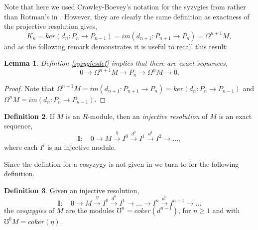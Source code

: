 \documentclass[11.5pt, twoside, a4paper, titlepage]{report}
\theoremstyle{definition}
\newtheorem{mydef}{Definition}[section]
\theoremstyle{plain}
\newtheorem{lem}[mydef]{Lemma}
\begin{document}
Note that here we used Crawley-Boevey's notation for the syzygies from \cite{CB1} rather than Rotman's in \cite{Rotman}. However, they are clearly the same definition as exactness of the projective resolution gives,
\begin{equation*}
K_n=ker(d_n:P_n \to P_{n-1}) = im(d_{n+1}:P_{n+1} \to P_n)=\Omega^{n+1}M,
\end{equation*}
and as the following remark demonstrates it is useful to recall this result:

\begin{lem} \label{syzygylem}
Defintion \ref{syzygiesdef} implies that there are exact sequences,
\begin{equation*}
0 \xrightarrow{} \Omega^{n+1}M \xrightarrow{} P_n \xrightarrow{} \Omega^nM \xrightarrow{} 0.
\end{equation*}
\end{lem}
\begin{proof}
Note that $\Omega^{n+1}M=im(d_{n+1}:P_{n+1} \to P_n)=ker(d_n:P_n \to P_{n-1})$ and $\Omega^nM=im(d_n:P_n \to P_{n-1})$.
\end{proof}

\begin{mydef}
If $M$ is an $R$-module, then an \emph{injective resolution} of $M$ is an exact sequence, 
\begin{equation*}
\mathbf{I}: \quad 0 \xrightarrow{}M \xrightarrow{\eta}I^0 \xrightarrow{d^0} I^1 \xrightarrow{d^1} I^2 \xrightarrow{} \dots,
\end{equation*}
where each $I^i$ is an injective module.
\end{mydef}

Since the defintion for a cosyzygy is not given in \cite{CB1} we turn to \cite{Rotman} for the following definition.

\begin{mydef}
Given an injective resolution,
\begin{equation*}
\mathbf{I}: \quad  0 \xrightarrow{} M \xrightarrow{\eta} I^0 \xrightarrow{d^0} I^1 \xrightarrow{} \dots \xrightarrow{} I^n \xrightarrow{d^n} I^{n+1} \xrightarrow{} \dots
\end{equation*}
the \emph{cosyzygies} of $M$ are the modules $\mho^n=coker(d^{n-1})$, for $n\geq 1$ and with $\mho^0M=coker(\eta)$.
\end{mydef}
\end{document}
